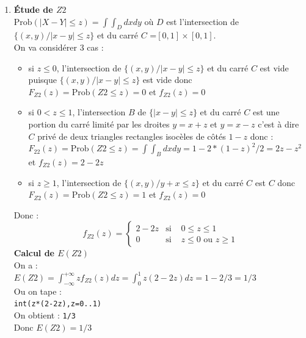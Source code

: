 \documentclass[a4paper,11pt]{book}
\begin{document}
\begin{enumerate}
\begin{enumerate}
{\bf Calcul de $V(Z1)$ et de $\sigma(Z1)$}\\
On a :\\
$\displaystyle V(Z1)=\int_{-\infty}^{+\infty}(z-1)^2f_{Z1}(z)dz=$\\
$\displaystyle \int_0^1z(z-1)^2dz+\int_1^2(z-1)^2(2-z)dz$\\
On tape :\\
{\tt int(z*(z-1)\verb|^|2,z=0..1)+int((z-1)\verb|^|2*(2-z),z=1..2)}\\
On obtient : {\tt 1/6}\\
Donc $V(Z1)=1/6$ et $\sigma(Z1)=\sqrt 6/6$.
\item {\bf \'Etude de $Z2$}\\
$\mbox{Prob}(|X-Y|\leq z)=\int\int_Ddxdy$ o\`u $D$ est l'intersection de 
$\{(x,y) / |x-y|\leq z\}$ et du carr\'e $C$ =$[0,1]\times [0,1]$.\\
On va consid\'erer 3 cas :
\begin{itemize}
\item si $z\leq 0$, l'intersection de $\{(x,y) / |x-y|\leq z\}$ et du carr\'e 
$C$ est vide puisque  $\{(x,y) / |x-y|\leq z\}$ est vide donc
 $F_{Z2}(z)=\mbox{Prob}(Z2\leq z)=0$ et $f_{Z2}(z)=0$
\item si $0<z\leq 1$, l'intersection $B$ de $\{|x-y| \leq z\}$ et du 
carr\'e $C$ est une portion du carr\'e limit\'e par les droites $y=x+z$ et 
$y=x-z$ c'est \`a dire $C$ priv\'e de deux triangles rectangles isoc\`eles de 
c\^ot\'es $1-z$ donc :\\
$\displaystyle F_{22}(z)=\mbox{Prob}(Z2\leq z)=\int\int_Bdxdy=1-2*(1-z)^2/2=2z-z^2$ et $f_{Z2}(z)=2-2z$
\item si $z\geq 1$, l'intersection de $\{(x,y) / y+x\leq z\}$ et du carr\'e $C$ est $C$ donc
 $\displaystyle F_{Z2}(z)=\mbox{Prob}(Z2\leq z)=1$ et $f_{Z2}(z)=0$
\end{itemize}
Donc :
$$
f_{Z2}(z)=
\left\{
\begin{array}{rll}
2-2z & \mbox{si }&0\leq z \leq 1\\
0 & \mbox{si }& z\leq 0 \mbox{ ou } z \geq 1
\end{array}
\right.
$$
{\bf Calcul de $E(Z2)$}\\
On a :\\
$\displaystyle E(Z2)=\int_{-\infty}^{+\infty}zf_{Z2}(z)dz=\int_0^1z(2-2z)dz=1-2/3=1/3$\\
Ou on tape :\\
{\tt int(z*(2-2z),z=0..1)}\\
On obtient : {\tt 1/3}\\
Donc $E(Z2)=1/3$


\end{enumerate}
\end{enumerate}
\end{document}
